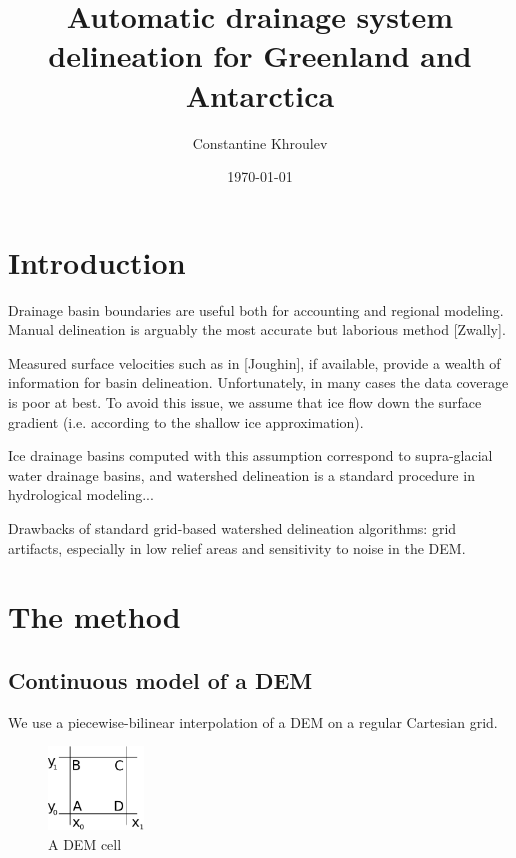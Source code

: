 \documentclass{amsart}
\begin{document}
\title{Automatic drainage system delineation for Greenland and Antarctica}
\author{Constantine Khroulev}
\date{\today}
\maketitle

\section{Introduction}
\label{sec:introduction}
Drainage basin boundaries are useful both for accounting and regional modeling.
Manual delineation is arguably the most accurate but laborious method [Zwally].

Measured surface velocities such as in [Joughin], if available, provide a
wealth of information for basin delineation. Unfortunately, in many cases the
data coverage is poor at best. To avoid this issue, we assume that ice flow
down the surface gradient (i.e. according to the shallow ice approximation).

Ice drainage basins computed with this assumption correspond to supra-glacial
water drainage basins, and watershed delineation is a standard procedure in
hydrological modeling...

Drawbacks of standard grid-based watershed delineation algorithms: grid
artifacts, especially in low relief areas and sensitivity to noise in the DEM.

\section{The method}
\label{sec:method}

\subsection{Continuous model of a DEM}
\label{sec:continuous-model-dem}

We use a piecewise-bilinear interpolation of a DEM on a regular Cartesian grid.

\begin{figure}[h]
  \centering
  \includegraphics[width=1in]{cell.pdf}
  \caption{A DEM cell}
  \label{fig:cell}
\end{figure}
\end{document}
